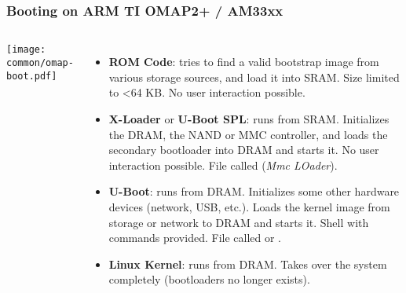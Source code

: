 \begin{frame}
\frametitle{Booting on ARM TI OMAP2+ / AM33xx}
  \begin{columns}
    \texttt{[image: common/omap-boot.pdf]}
    \footnotesize
    \begin{itemize}
    \item {\bf ROM Code}: tries to find a valid bootstrap image from
      various storage sources, and load it into SRAM. Size
      limited to \textless 64 KB. No user interaction possible.
    \item {\bf X-Loader} or {\bf U-Boot SPL}: runs from SRAM. Initializes
      the DRAM, the NAND or MMC controller, and loads the secondary
      bootloader into DRAM and starts it. No user interaction
      possible. File called  ({\em Mmc LOader}).
    \item {\bf U-Boot}: runs from DRAM. Initializes some other hardware
      devices (network, USB, etc.).  Loads the kernel image from
      storage or network to DRAM and starts it. Shell with commands
      provided. File called  or .
    \item {\bf Linux Kernel}: runs from DRAM. Takes over the system
      completely (bootloaders no longer exists).
    \end{itemize}
  \end{columns}
\end{frame}

